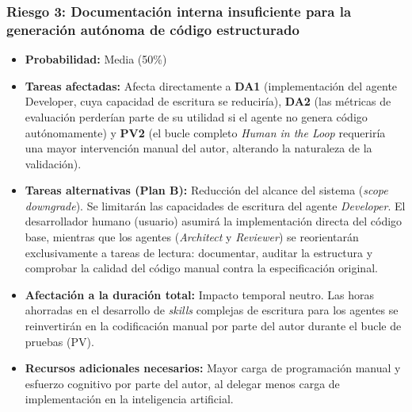 \documentclass[11pt, letterpaper]{article}
\begin{document}
\subsubsection{Riesgo 3: Documentación interna insuficiente para la generación autónoma de código estructurado}
\label{sec:riesgo3}
\begin{itemize}
    \item \textbf{Probabilidad:} Media (50\%)
    \item \textbf{Tareas afectadas:} Afecta directamente a \textbf{DA1} (implementación del agente Developer, cuya capacidad de escritura se reduciría), \textbf{DA2} (las métricas de evaluación perderían parte de su utilidad si el agente no genera código autónomamente) y \textbf{PV2} (el bucle completo \textit{Human in the Loop} requeriría una mayor intervención manual del autor, alterando la naturaleza de la validación).
    \item \textbf{Tareas alternativas (Plan B):} Reducción del alcance del sistema (\textit{scope downgrade}). Se limitarán las capacidades de escritura del agente \textit{Developer}. El desarrollador humano (usuario) asumirá la implementación directa del código base, mientras que los agentes (\textit{Architect} y \textit{Reviewer}) se reorientarán exclusivamente a tareas de lectura: documentar, auditar la estructura y comprobar la calidad del código manual contra la especificación original.
    \item \textbf{Afectación a la duración total:} Impacto temporal neutro. Las horas ahorradas en el desarrollo de \textit{skills} complejas de escritura para los agentes se reinvertirán en la codificación manual por parte del autor durante el bucle de pruebas (PV).
    \item \textbf{Recursos adicionales necesarios:} Mayor carga de programación manual y esfuerzo cognitivo por parte del autor, al delegar menos carga de implementación en la inteligencia artificial.
\end{itemize}
\end{document}
